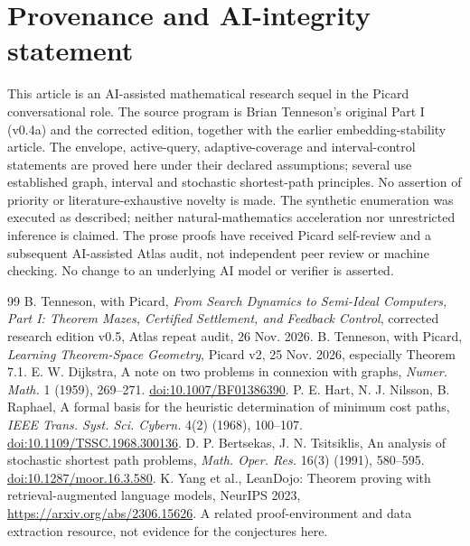 \documentclass[11pt]{article}
\theoremstyle{definition}\newtheorem{definition}[theorem]{Definition}\newtheorem{example}[theorem]{Example}\newtheorem{conjecture}[theorem]{Conjecture}
\begin{document}
\section*{Provenance and AI-integrity statement}
This article is an AI-assisted mathematical research sequel in the Picard conversational role. The source program is Brian Tenneson's original Part I (v0.4a) and the corrected edition, together with the earlier embedding-stability article. The envelope, active-query, adaptive-coverage and interval-control statements are proved here under their declared assumptions; several use established graph, interval and stochastic shortest-path principles. No assertion of priority or literature-exhaustive novelty is made. The synthetic enumeration was executed as described; neither natural-mathematics acceleration nor unrestricted inference is claimed. The prose proofs have received Picard self-review and a subsequent AI-assisted Atlas audit, not independent peer review or machine checking. No change to an underlying AI model or verifier is asserted.
\small\begin{thebibliography}{99}
 B. Tenneson, with Picard, \emph{From Search Dynamics to Semi-Ideal Computers, Part I: Theorem Mazes, Certified Settlement, and Feedback Control}, corrected research edition v0.5, Atlas repeat audit, 26 Nov. 2026.
 B. Tenneson, with Picard, \emph{Learning Theorem-Space Geometry}, Picard v2, 25 Nov. 2026, especially Theorem 7.1.
 E. W. Dijkstra, A note on two problems in connexion with graphs, \emph{Numer. Math.} 1 (1959), 269--271. \href{https://doi.org/10.1007/BF01386390}{doi:10.1007/BF01386390}.
 P. E. Hart, N. J. Nilsson, B. Raphael, A formal basis for the heuristic determination of minimum cost paths, \emph{IEEE Trans. Syst. Sci. Cybern.} 4(2) (1968), 100--107. \href{https://doi.org/10.1109/TSSC.1968.300136}{doi:10.1109/TSSC.1968.300136}.
 D. P. Bertsekas, J. N. Tsitsiklis, An analysis of stochastic shortest path problems, \emph{Math. Oper. Res.} 16(3) (1991), 580--595. \href{https://doi.org/10.1287/moor.16.3.580}{doi:10.1287/moor.16.3.580}.
 K. Yang et al., LeanDojo: Theorem proving with retrieval-augmented language models, NeurIPS 2023, \url{https://arxiv.org/abs/2306.15626}. A related proof-environment and data extraction resource, not evidence for the conjectures here.
\end{thebibliography}
\end{document}
